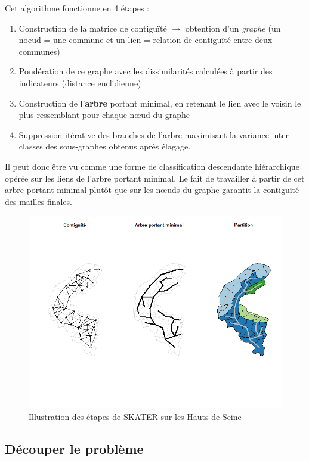 \documentclass[12pt, a4paper]{article}
\begin{document}
Cet algorithme fonctionne en 4 étapes :

\begin{enumerate}
\item Construction de la matrice de contiguïté $\rightarrow$ obtention d'un \emph{graphe} (un noeud = une commune et un lien = relation de contiguïté entre deux communes)
\item Pondération de ce graphe avec les dissimilarités calculées à partir des indicateurs (distance euclidienne)
\item Construction de l'\textbf{arbre} portant minimal, en retenant le lien avec le voisin le plus ressemblant pour chaque n\oe ud du graphe
\item Suppression itérative des branches de l'arbre maximisant la variance inter-classes des sous-graphes obtenus après élagage.
\end{enumerate}

Il peut donc être vu comme une forme de classification descendante hiérarchique opérée sur les liens de l'arbre portant minimal. Le fait de travailler à partir de cet arbre portant minimal plutôt que sur les n\oe uds du graphe garantit la contiguïté des mailles finales.

\begin{center}
\begin{figure}[H]
\caption{Illustration des étapes de SKATER sur les Hauts de Seine}
\includegraphics[scale=.7]{img/SKATER.png}
\end{figure}
\end{center}

\subsection{Découper le problème}
\end{document}
